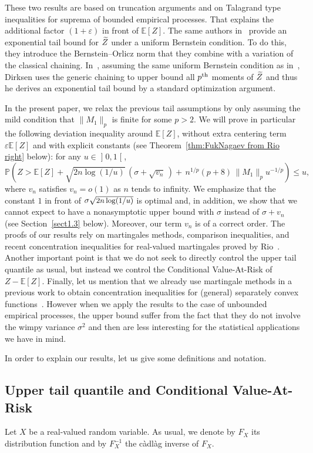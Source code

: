 \documentclass[AHL,Unicode,longabstracts,published]{cedram}
\newcommand{\bE}{\mathbb{E}}
\newcommand{\bP}{\mathbb{P}}
\newcommand{\intervalleoo}[2]{\mathopen{]} #1\mathclose{}\mathpunct{},#2\mathclose{[}}
\let\oldtilde\tilde
\renewcommand*{\tilde}[1]{\mathchoice{\widetilde{#1}}{\widetilde{#1}}{\oldtilde{#1}}{\oldtilde{#1}}}
\begin{document}
These two results are based on truncation arguments and on Talagrand type inequalities for suprema of bounded empirical processes. That explains the additional factor $(1+\varepsilon)$ in front of $\bE[Z]$. The same authors in~\cite[Theorem~8]{vdGL13} provide an exponential tail bound for $\tilde Z$ under a uniform Bernstein condition. To do this, they introduce the Bernstein--Orlicz norm that they combine with a variation of the classical chaining. In~\cite[Corollary~5.2]{Dirksen15}, assuming the same uniform Bernstein condition as in~\cite{vdGL13}, Dirksen uses the generic chaining to upper bound all $p^{\rm th}$ moments of $\tilde Z$ and thus he derives an exponential tail bound by a standard optimization argument.

In the present paper, we relax the previous tail assumptions by only assuming the mild condition that $\|M_1\|_p$ is finite for some $p>2$. We will prove in particular the following deviation inequality around $\bE[Z]$, without extra centering term $\varepsilon\bE[Z]$ and with explicit constants (see Theorem~\ref{thm:FukNagaev from Rio right} below): for any $u\in\intervalleoo 01$,
\[
\bP\left(Z>\bE[Z]+\sqrt{2n\log(1/u)}\,\left(\sigma+\sqrt{v_n}\,\right)+\,n^{1/p}(p+8)\,\|M_1\|_p u^{-1/p}\right)\leq u,
\]
where $v_n$ satisfies $v_n=o(1)$ as $n$ tends to infinity. We emphasize that the constant $1$ in front of $\sigma\sqrt{\text{\small{$2n\log(1/u)$}}}$ is optimal and, in addition, we show that we cannot expect to have a nonasymptotic upper bound with $\sigma$ instead of $\sigma+v_n$ (see Section~\ref{sect1.3} below). Moreover, our term $v_n$ is of a correct order. The proofs of our results rely on martingales methods, comparison inequalities, and recent concentration inequalities for real-valued martingales proved by Rio~\cite{Rio17a}. Another important point is that we do not seek to directly control the upper tail quantile as usual, but instead we control the Conditional Value-At-Risk of $Z-\bE[Z]$. Finally, let us mention that we already use martingale methods in a previous work to obtain concentration inequalities for (general) separately convex functions~\cite{Marchina18a}. However when we apply the results to the case of unbounded empirical processes, the upper bound suffer from the fact that they do not involve the wimpy variance $\sigma^2$ and then are less interesting for the statistical applications we have in mind.

In order to explain our results, let us give some definitions and notation.

\subsection{Upper tail quantile and Conditional Value-At-Risk}
Let $X$ be a real-valued random variable. As usual, we denote by $F_X$ its distribution function and by $F_X^{-1}$ the càdlàg inverse of $F_X$.
\end{document}
